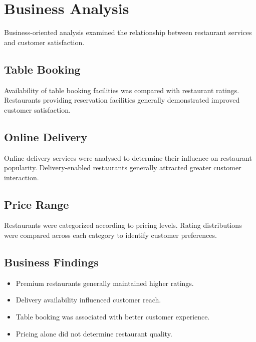 \documentclass[12pt,a4paper]{report}
\begin{document}

\section{Business Analysis}

Business-oriented analysis examined the relationship between restaurant services and customer satisfaction.

\subsection{Table Booking}

Availability of table booking facilities was compared with restaurant ratings. Restaurants providing reservation facilities generally demonstrated improved customer satisfaction.

\subsection{Online Delivery}

Online delivery services were analysed to determine their influence on restaurant popularity. Delivery-enabled restaurants generally attracted greater customer interaction.

\subsection{Price Range}

Restaurants were categorized according to pricing levels. Rating distributions were compared across each category to identify customer preferences.

\subsection{Business Findings}

\begin{itemize}
\item Premium restaurants generally maintained higher ratings.
\item Delivery availability influenced customer reach.
\item Table booking was associated with better customer experience.
\item Pricing alone did not determine restaurant quality.
\end{itemize}

\end{document}
